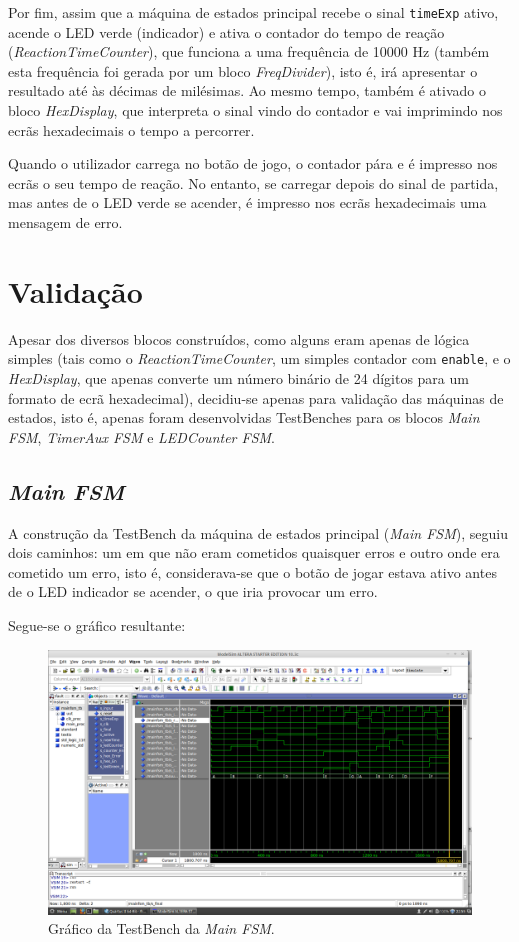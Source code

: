 \documentclass[a4paper,11pt,onecolumn]{report}
\begin{document}
Por fim, assim que a máquina de estados principal recebe o sinal \texttt{timeExp} ativo, acende o LED verde (indicador) e ativa o contador do tempo de reação (\textit{ReactionTimeCounter}), que funciona a uma frequência de 10000 Hz (também esta frequência foi gerada por um bloco \textit{FreqDivider}), isto é, irá apresentar o resultado até às décimas de milésimas. Ao mesmo tempo, também é ativado o bloco \textit{HexDisplay}, que interpreta o sinal vindo do contador e vai imprimindo nos ecrãs hexadecimais o tempo a percorrer.

Quando o utilizador carrega no botão de jogo, o contador pára e é impresso nos ecrãs o seu tempo de reação. No entanto, se carregar depois do sinal de partida, mas antes de o LED verde se acender, é impresso nos ecrãs hexadecimais uma mensagem de erro.

\section{Validação}

Apesar dos diversos blocos construídos, como alguns eram apenas de lógica simples (tais como o \textit{ReactionTimeCounter}, um simples contador com \texttt{enable}, e o \textit{HexDisplay}, que apenas converte um número binário de 24 dígitos para um formato de ecrã hexadecimal), decidiu-se apenas para validação das máquinas de estados, isto é, apenas foram desenvolvidas TestBenches para os blocos \textit{Main FSM}, \textit{TimerAux FSM} e \textit{LEDCounter FSM}.

\subsection{\textit{Main FSM}}
A construção da TestBench da máquina de estados principal (\textit{Main FSM}), seguiu dois caminhos: um em que não eram cometidos quaisquer erros e outro onde era cometido um erro, isto é, considerava-se que o botão de jogar estava ativo antes de o LED indicador se acender, o que iria provocar um erro.

Segue-se o gráfico resultante:

\begin{figure}[h]
\centerline{\includegraphics[scale=0.33]{Images/MainFSMTB}}
\caption{Gráfico da TestBench da \textit{Main FSM}.}
\label{figmainfsmtb}
\end{figure}
\end{document}
